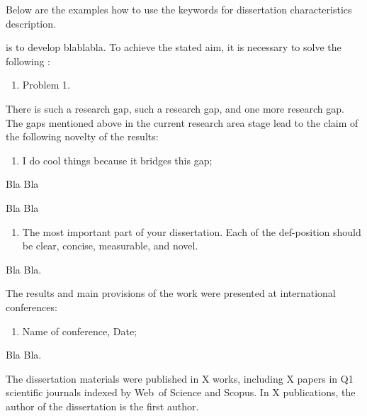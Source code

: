 Below are the examples how to use the keywords for dissertation characteristics description. 

{\aim} is to develop blablabla. To achieve the stated aim, it is necessary to solve the following {\tasks}:
\begin{enumerate}[beginpenalty=10000] %
\item Problem 1. 
\end{enumerate}

{\novelty}
There is such a research gap, such a research gap, and one more research gap.  
The gaps mentioned above in the current research area stage lead to the claim of the following novelty of the results:
\begin{enumerate}[beginpenalty=10000] %
	\item I do cool things because it bridges this gap; 
\end{enumerate}

{\influence}
Bla Bla

{\methods}
Bla Bla

{}
\begin{enumerate}[beginpenalty=10000] %
  \item The most important part of your dissertation. Each of the def-position should be clear, concise, measurable, and novel.  
\end{enumerate}

{\reliability} Bla Bla. 

{\probation}
The  results  and  main  provisions  of  the  work  were  presented  at  international 
conferences:
\begin{enumerate}
	\item Name of conference, Date;
\end{enumerate}

{\contribution} Bla Bla. 

{\publications} The dissertation materials were published in X works, including X papers in Q1 scientific journals indexed by Web~of Science and Scopus. In X publications, the author of the dissertation is the first author. 
